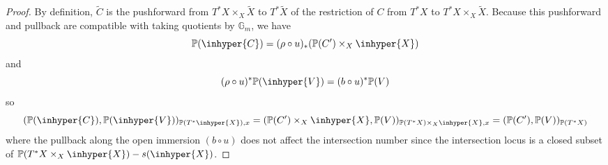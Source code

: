 \begin{proof}
By definition, $\tilde{C}$ is the pushforward from $T^* X \times_X \tilde{X}$ to $T^* \tilde{X}$ of the restriction of $C$ from $T^* X$ to $T^* X \times_X \tilde{X}$. Because this pushforward and pullback are compatible with taking quotients by $\mathbb G_m$, we have \[  \mathbb P( \inhyper{C})  = (\rho \circ u) _*  ( \mathbb P(C') \times_X \inhyper{X}) \] and \[(\rho\circ u)^* \mathbb P(\inhyper{V}) =(b \circ u)^*  \mathbb P(V)\]
so \cite[Proposition 8.1.1(c)]{Fulton} \[ ( \mathbb P( \inhyper{C}), \mathbb P(\inhyper{V}))_{\mathbb P(T^* \inhyper{X}), x}
=  (  \mathbb P(C') \times_X \inhyper{X}  , \mathbb P(V))_{\mathbb P(T^* X)\times_{X} \inhyper{X},x }  = (\mathbb P(C'), \mathbb P(V))_{\mathbb P(T^* X)} \] where the pullback along the open immersion $(b\circ u)$ does not affect the intersection number since the intersection locus is a closed subset of $  \mathbb P(T^*X \times_X \inhyper{X}  ) - s(\inhyper{X})$.




%
%
%
%
%



\end{proof}
